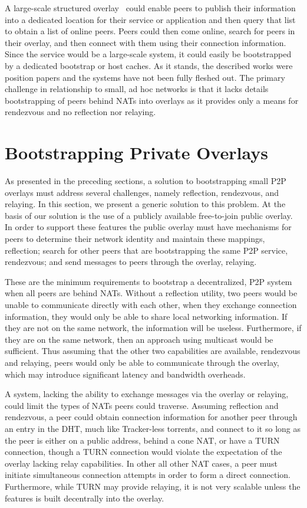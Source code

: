 \documentclass[conference]{IEEEtran}
\begin{document}
A large-scale structured overlay~\cite{one_ring, p2p_bootstrap} could enable
peers to publish their information into a dedicated location for their service
or application and then query that list to obtain a list of online peers.
Peers could then come online, search for peers in their overlay, and then
connect with them using their connection information.  Since the service would
be a large-scale system, it could easily be bootstrapped by a dedicated
bootstrap or host caches.  As it stands, the described works were position
papers and the systems have not been fully fleshed out.  The primary challenge
in relationship to small, ad hoc networks is that it lacks details
bootstrapping of peers behind NATs into overlays as it provides only a means
for rendezvous and no reflection nor relaying.

\section{Bootstrapping Private Overlays}
\label{overview}

As presented in the preceding sections, a solution to bootstrapping small P2P
overlays must address several challenges, namely reflection, rendezvous, and
relaying.  In this section, we present a generic solution to this problem.  At
the basis of our solution is the use of a publicly available free-to-join
public overlay.  In order to support these features the public overlay must
have mechanisms for peers to determine their network identity and maintain
these mappings, reflection; search for other peers that are bootstrapping the
same P2P service, rendezvous; and send messages to peers through the overlay,
relaying.

These are the minimum requirements to bootstrap a decentralized, P2P system
when all peers are behind NATs.  Without a reflection utility, two peers would
be unable to communicate directly with each other, when they exchange
connection information, they would only be able to share local networking
information.  If they are not on the same network, the information will be
useless.  Furthermore, if they are on the same network, then an approach using
multicast would be sufficient.  Thus assuming that the other two capabilities
are available, rendezvous and relaying, peers would only be able to communicate
through the overlay, which may introduce significant latency and bandwidth
overheads.  

A system, lacking the ability to exchange messages via the overlay or relaying,
could limit the types of NATs peers could traverse.  Assuming reflection and
rendezvous, a peer could obtain connection information for another peer through
an entry in the DHT, much like Tracker-less torrents, and connect to it so long
as the peer is either on a public address, behind a cone NAT, or have a TURN
connection, though a TURN connection would violate the expectation of the
overlay lacking relay capabilities.  In other all other NAT cases, a peer must
initiate simultaneous connection attempts in order to form a direct
connection.  Furthermore, while TURN may provide relaying, it is not very
scalable unless the features is built decentrally into the overlay.
\end{document}
